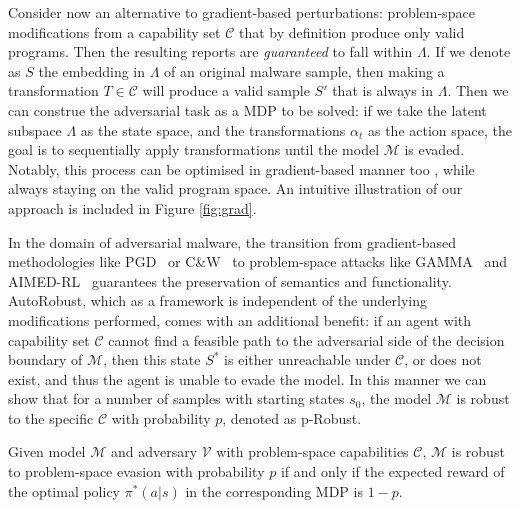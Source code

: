 Consider now an alternative to gradient-based perturbations: problem-space modifications from a capability set $\mathcal{C}$ that by definition produce only valid programs.
Then the resulting reports are \textit{guaranteed} to fall within $\Lambda$.
If we denote as $S$ the embedding in $\Lambda$ of an original malware sample, then making a transformation $T \in \mathcal{C}$ will produce a valid sample $S'$ that is always in $\Lambda$.
Then we can construe the adversarial task as a \gls{MDP} to be solved: if we take the latent subspace $\Lambda$ as the state space, and the transformations $\alpha_t$ as the action space, the goal is to sequentially apply transformations until the model $\mathcal{M}$ is evaded.
Notably, this process can be optimised in gradient-based manner too \cite{sutton1999policy}, while always staying on the valid program space.
An intuitive illustration of our approach is included in Figure \ref{fig:grad}.

In the domain of adversarial malware, the transition from gradient-based methodologies like PGD~\cite{madry2017towards} or C\&W~\cite{carlini2017towards} to problem-space attacks like GAMMA~\cite{demetrio2021functionality} and AIMED-RL~\cite{labaca2021aimed} guarantees the preservation of semantics and functionality.
AutoRobust, which as a framework is independent of the underlying modifications performed, comes with an additional benefit: if an agent with capability set $\mathcal{C}$ cannot find a feasible path to the adversarial side of the decision boundary of $\mathcal{M}$, then this state $S^*$ is either unreachable under $\mathcal{C}$, or does not exist, and thus the agent is unable to evade the model.
In this manner we can show that for a number of samples with starting states $s_0$, the model $\mathcal{M}$ is robust to the specific $\mathcal{C}$ with probability $p$, denoted as p-Robust.

\begin{theorem}
Given model $\mathcal{M}$ and adversary $\mathcal{V}$ with problem-space capabilities $\mathcal{C}$, $\mathcal{M}$ is robust to problem-space evasion with probability $p$ if and only if the expected reward of the optimal policy $\pi^*(a|s)$ in the corresponding MDP is $1-p$.
\label{th:pspr}
\end{theorem}

